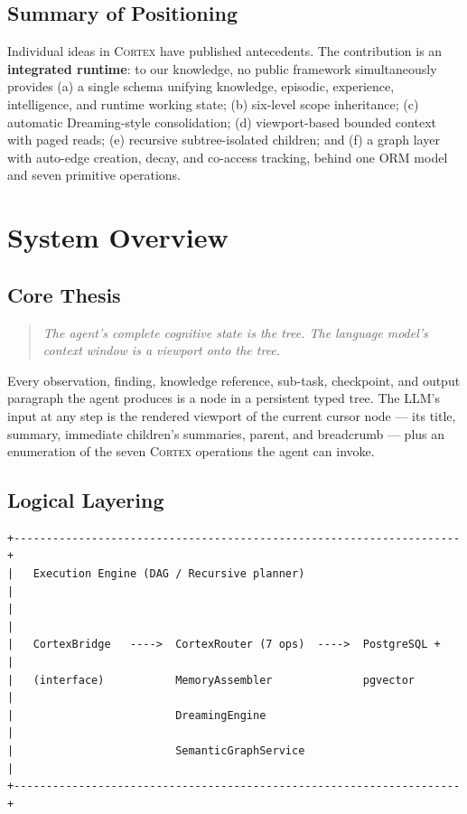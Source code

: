 \documentclass[11pt,a4paper]{article}
\theoremstyle{cortexprop}
\begin{document}
\subsection{Summary of Positioning}
Individual ideas in \textsc{Cortex} have published antecedents. The
contribution is an \textbf{integrated runtime}: to our knowledge, no public
framework simultaneously provides (a) a single schema unifying knowledge,
episodic, experience, intelligence, and runtime working state; (b)
six-level scope inheritance; (c) automatic Dreaming-style consolidation;
(d) viewport-based bounded context with paged reads; (e) recursive
subtree-isolated children; and (f) a graph layer with auto-edge creation,
decay, and co-access tracking, behind one ORM model and seven primitive
operations.

\section{System Overview}
\label{sec:overview}

\subsection{Core Thesis}

\begin{quote}
\itshape
The agent's complete cognitive state is the tree. The language model's
context window is a viewport onto the tree.
\end{quote}

Every observation, finding, knowledge reference, sub-task, checkpoint, and
output paragraph the agent produces is a node in a persistent typed tree.
The LLM's input at any step is the rendered viewport of the current cursor
node --- its title, summary, immediate children's summaries, parent, and
breadcrumb --- plus an enumeration of the seven \textsc{Cortex} operations
the agent can invoke.

\subsection{Logical Layering}

\begin{lstlisting}[basicstyle=\ttfamily\scriptsize]
+---------------------------------------------------------------------+
|   Execution Engine (DAG / Recursive planner)                        |
|                                                                     |
|   CortexBridge   ---->  CortexRouter (7 ops)  ---->  PostgreSQL +   |
|   (interface)           MemoryAssembler              pgvector       |
|                         DreamingEngine                              |
|                         SemanticGraphService                        |
+---------------------------------------------------------------------+
\end{lstlisting}
\end{document}

